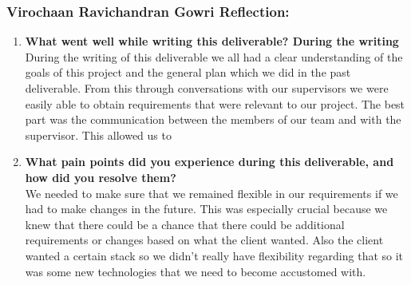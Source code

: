 \subsubsection*{Virochaan Ravichandran Gowri Reflection:}
\begin{enumerate}
  \item \textbf{What went well while writing this deliverable? 
  During the writing} \\
  During the writing of this deliverable we all had a clear understanding of the goals of this project and the general plan which we did in the past deliverable. From this through conversations with our supervisors we were easily able to obtain requirements that were relevant to our project. The best part was the communication between the members of our team and with the supervisor. This allowed us to 
  \item \textbf{What pain points did you experience during this deliverable, and how did you resolve them?} \\
  We needed to make sure that we remained flexible in our requirements if we had to make changes in the future. This was especially crucial because we knew that there could be a chance that there could be additional requirements or changes based on what the client wanted. Also the client wanted a certain stack so we didn't really have flexibility regarding that so it was some new technologies that we need to become accustomed with. 
  
\end{enumerate}


